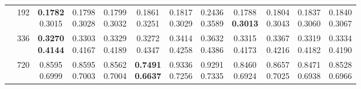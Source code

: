 \begin{longtable}{@{}llcccccccccc@{}}
 & 192 & \shortstack{\colorbox[gray]{0.82}{\textbf{0.1782}}\\\colorbox[gray]{0.92}{0.3015}} & \shortstack{0.1798\\0.3028} & \shortstack{0.1799\\0.3032} & \shortstack{0.1861\\0.3251} & \shortstack{0.1817\\0.3029} & \shortstack{0.2436\\0.3589} & \shortstack{\colorbox[gray]{0.92}{0.1788}\\\colorbox[gray]{0.82}{\textbf{0.3013}}} & \shortstack{0.1804\\0.3043} & \shortstack{0.1837\\0.3060} & \shortstack{0.1840\\0.3067} \\ \cline{2-12}

 & 336 & \shortstack{\colorbox[gray]{0.82}{\textbf{0.3270}}\\\colorbox[gray]{0.82}{\textbf{0.4144}}} & \shortstack{0.3303\\\colorbox[gray]{0.92}{0.4167}} & \shortstack{0.3329\\0.4189} & \shortstack{\colorbox[gray]{0.92}{0.3272}\\0.4347} & \shortstack{0.3414\\0.4258} & \shortstack{0.3632\\0.4386} & \shortstack{0.3315\\0.4173} & \shortstack{0.3367\\0.4216} & \shortstack{0.3319\\0.4182} & \shortstack{0.3334\\0.4190} \\ \cline{2-12}

 & 720 & \shortstack{0.8595\\0.6999} & \shortstack{0.8595\\0.7003} & \shortstack{0.8562\\0.7004} & \shortstack{\colorbox[gray]{0.82}{\textbf{0.7491}}\\\colorbox[gray]{0.82}{\textbf{0.6637}}} & \shortstack{0.9336\\0.7256} & \shortstack{0.9291\\0.7335} & \shortstack{\colorbox[gray]{0.92}{0.8460}\\\colorbox[gray]{0.92}{0.6924}} & \shortstack{0.8657\\0.7025} & \shortstack{0.8471\\0.6938} & \shortstack{0.8528\\0.6966} \\ \hline


\end{longtable}
